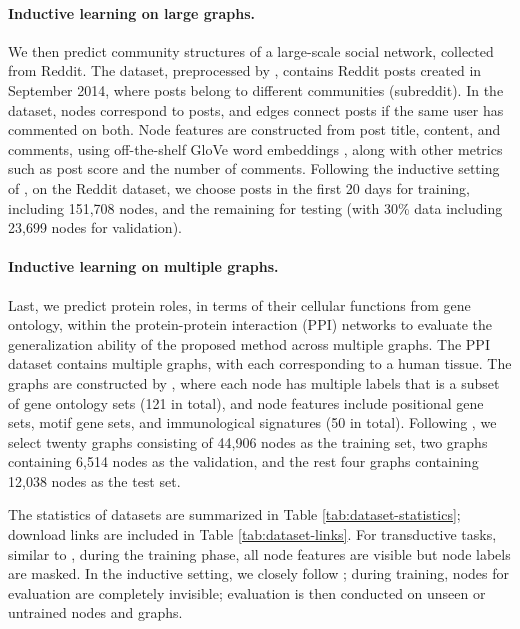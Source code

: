\documentclass{article}
\theoremstyle{remark}
\begin{document}
\paragraph{Inductive learning on large graphs.}
We then predict community structures of a large-scale social network, collected from Reddit. The dataset, preprocessed by \cite{Hamilton:2017tp}, contains Reddit posts created in September 2014, where posts belong to different communities (subreddit). In the dataset, nodes correspond to posts, and edges connect posts if the same user has commented on both.
Node features are constructed from post title, content, and comments, using off-the-shelf GloVe word embeddings \cite{Pennington:2014kh}, along with other metrics such as post score and the number of comments. 
Following the inductive setting of \cite{Hamilton:2017tp,Velickovic:2019tu}, on the Reddit dataset, we choose posts in the first 20 days for training, including 151,708 nodes, and the remaining for testing (with 30\% data including 23,699 nodes for validation).

\paragraph{Inductive learning on multiple graphs.}
Last, we predict protein roles, in terms of their cellular functions from gene ontology, within the protein-protein interaction (PPI) networks \cite{Zitnik:2017uz} to evaluate the generalization ability of the proposed method across multiple graphs.
The PPI dataset contains multiple graphs, with each corresponding to a human tissue.
The graphs are constructed by \cite{Hamilton:2017tp}, where each node has multiple labels that is a subset of gene ontology sets (121 in total), and node features include positional gene sets, motif gene sets, and immunological signatures (50 in total).
Following \cite{Hamilton:2017tp}, we select twenty graphs consisting of 44,906 nodes as the training set, two graphs containing 6,514 nodes as the validation, and the rest four graphs containing 12,038 nodes as the test set.

The statistics of datasets are summarized in Table \ref{tab:dataset-statistics}; download links are included in Table \ref{tab:dataset-links}.
For transductive tasks, similar to \cite{Kipf:2016tc}, during the training phase, all node features are visible but node labels are masked. In the inductive setting, we closely follow \cite{Hamilton:2017tp}; during training, nodes for evaluation are completely invisible; evaluation is then conducted on unseen or untrained nodes and graphs.
\end{document}
